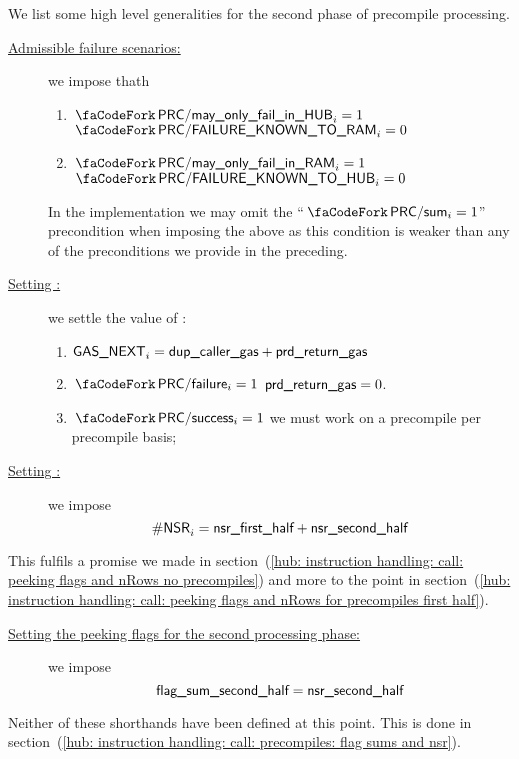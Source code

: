 \begin{center}
\end{center}
We list some high level generalities for the second phase of precompile processing. 
\begin{description}
	\item[\underline{Admissible failure scenarios:}]
		we impose thath
		\begin{enumerate}
			\item \If $\scenPrecompileMayOnlyFailInHub _{i} = 1$ \Then $\scenPrcFailureKnownToRam _{i} = 0$
			\item \If $\scenPrecompileMayOnlyFailInRam _{i} = 1$ \Then $\scenPrcFailureKnownToHub _{i} = 0$
		\end{enumerate}
		\saNote{}
		In the implementation we may omit the ``$\scenPrecompileSum _{i} = 1$'' precondition when imposing the above
		as this condition is weaker than any of the preconditions we provide in the preceding.
	\item[\underline{Setting \gasNext{}:}] we settle the value of \gasNext{}:
		\begin{enumerate}
			\item $\textsf{GAS}\textsf{\_NEXT}_{i} = \textsf{dup\_caller\_gas} + \textsf{prd\_return\_gas}$
			\item \If $\scenPrcFailure_{i} = 1$ \Then $\textsf{prd\_return\_gas} = 0$.
			\item \If $\scenPrcSuccess_{i} = 1$ \Then we must work on a precompile per precompile basis;
		\end{enumerate}
	\item[\underline{Setting \nonStackRows{}:}]
		we impose
		\[ \textsf{\#NSR}_{i} = \textsf{nsr}\textsf{\_first\_half} + \textsf{nsr}\textsf{\_second\_half} \]
\end{description}
\saNote{} This fulfils a promise we made in
section~(\ref{hub: instruction handling: call: peeking flags and nRows no precompiles}) and more to the point in
section~(\ref{hub: instruction handling: call: peeking flags and nRows for precompiles first half}).
\begin{description}
	\item[\underline{Setting the peeking flags for the second processing phase:}]
		we impose
		\[ \textsf{flag\_sum}\textsf{\_second\_half} = \textsf{nsr}\textsf{\_second\_half} \]
\end{description} 
\saNote{} 
Neither of these shorthands have been defined at this point. This is done in section~(\ref{hub: instruction handling: call: precompiles: flag sums and nsr}).
